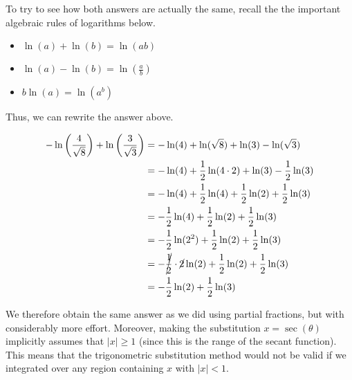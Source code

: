 \documentclass[noauthor, handout]{ximera}
\begin{document}
\begin{freeResponse}
To try to see how both answers are actually the same, recall the the important algebraic rules of logarithms below.

\begin{itemize}
\item $\ln(a)+\ln(b) = \ln(ab)$ 
\item $ \ln(a)-\ln(b) = \ln\left(\frac{a}{b}\right)$
\item $b \ln(a) = \ln\left(a^b\right)$
\end{itemize}

Thus, we can rewrite the answer above.

\begin{align*}
-\ln \left(\frac{4}{\sqrt{8}}\right) + \ln \left(\frac{3}{\sqrt{3}}\right) &= -\ln(4)+\ln(\sqrt{8}) + \ln(3)-\ln(\sqrt{3}) \\
& = -\ln(4)+\frac{1}{2} \ln(4\cdot 2) + \ln(3)-\frac{1}{2}\ln(3) \\
& = -\ln(4)+\frac{1}{2} \ln(4) +\frac{1}{2} \ln(2) + \frac{1}{2}\ln(3) \\
& = -\frac{1}{2} \ln(4) +\frac{1}{2} \ln(2) + \frac{1}{2}\ln(3) \\
& = -\frac{1}{2} \ln(2^2) +\frac{1}{2} \ln(2) + \frac{1}{2}\ln(3) \\
& = -\cancel{\frac{1}{2}} \cdot \cancel{2} \ln(2) +\frac{1}{2} \ln(2) + \frac{1}{2}\ln(3) \\
& = -\frac{1}{2} \ln(2) + \frac{1}{2}\ln(3) \\
\end{align*}

We therefore obtain the same answer as we did using partial fractions, but with considerably more effort. Moreover, making the substitution $x=\sec( \theta)$ implicitly assumes that $|x| \geq 1$ (since this is the range of the secant function). This means that the trigonometric substitution method would not be valid if we integrated over any region containing $x$ with $|x| < 1$. 
\end{freeResponse}
\end{document}
